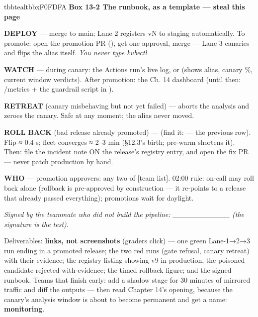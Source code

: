 \begin{calloutbox}{tbbteal}{tbbxF0FDFA}
{\normalsize\bfseries\color{tbbx115E59}Box 13-2  The runbook, as a template — steal this page}\par\vspace{3pt}
\textbf{DEPLOY} — merge to main; Lane 2 registers vN to staging automatically. To promote: open the promotion PR (), get one approval, merge — Lane 3 canaries and flips the alias itself. \textit{You never type kubectl.}

\textbf{WATCH} — during canary: the Actions run's live log, or  (shows alias, canary \%, current window verdicts). After promotion: the Ch. 14 dashboard (until then: /metrics + the guardrail script in ).

\textbf{RETREAT} (canary misbehaving but not yet failed) —  aborts the analysis and zeroes the canary. Safe at any moment; the alias never moved.

\textbf{ROLL BACK} (bad release already promoted) —  (find it:  — the previous  row). Flip ≈ 0.4 s; fleet converges ≈ 2–3 min (§12.3's birth; pre-warm shortens it). Then: file the incident note ON the release's registry entry, and open the fix PR — never patch production by hand.

\textbf{WHO} — promotion approvers: any two of [team list]. 02:00 rule: on-call may roll back alone (rollback is pre-approved by construction — it re-points to a release that already passed everything); promotions wait for daylight.

\textit{Signed by the teammate who did not build the pipeline: \_\_\_\_\_\_\_\_\_\_\_ (the signature is the test).}
\end{calloutbox}

\vspace{3.0pt}

Deliverables: \textbf{links, not screenshots} (graders click) — one green Lane-1→2→3 run ending in a promoted release; the two red runs (gate refusal, canary retreat) with their evidence; the registry listing showing v9 in production, the poisoned candidate rejected-with-evidence; the timed rollback figure; and the signed runbook. Teams that finish early: add a shadow stage for 30 minutes of mirrored traffic and diff the outputs — then read Chapter 14's opening, because the canary's analysis window is about to become permanent and get a name: \textbf{monitoring}.

